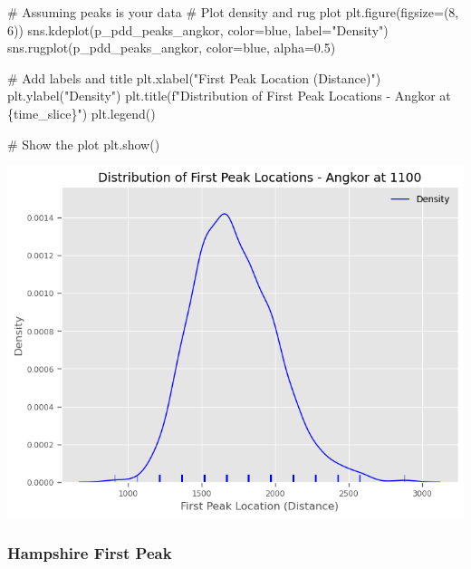 \documentclass[
  11pt,
  letterpaper,
  DIV=11,
  numbers=noendperiod]{scrartcl}
\newenvironment{Shaded}{\begin{snugshade}}{\end{snugshade}}
\newcommand{\CommentTok}[1]{\textcolor[rgb]{0.37,0.37,0.37}{#1}}
\newcommand{\DecValTok}[1]{\textcolor[rgb]{0.68,0.00,0.00}{#1}}
\newcommand{\FloatTok}[1]{\textcolor[rgb]{0.68,0.00,0.00}{#1}}
\newcommand{\NormalTok}[1]{\textcolor[rgb]{0.00,0.23,0.31}{#1}}
\newcommand{\OperatorTok}[1]{\textcolor[rgb]{0.37,0.37,0.37}{#1}}
\newcommand{\SpecialCharTok}[1]{\textcolor[rgb]{0.37,0.37,0.37}{#1}}
\newcommand{\SpecialStringTok}[1]{\textcolor[rgb]{0.13,0.47,0.30}{#1}}
\newcommand{\StringTok}[1]{\textcolor[rgb]{0.13,0.47,0.30}{#1}}
\begin{document}
\begin{Shaded}
\begin{Highlighting}[]
\CommentTok{\# Assuming \textasciigrave{}peaks\textasciigrave{} is your data}
\CommentTok{\# Plot density and rug plot}
\NormalTok{plt.figure(figsize}\OperatorTok{=}\NormalTok{(}\DecValTok{8}\NormalTok{, }\DecValTok{6}\NormalTok{))}
\NormalTok{sns.kdeplot(p\_pdd\_peaks\_angkor, color}\OperatorTok{=}\StringTok{\textquotesingle{}blue\textquotesingle{}}\NormalTok{, label}\OperatorTok{=}\StringTok{"Density"}\NormalTok{)}
\NormalTok{sns.rugplot(p\_pdd\_peaks\_angkor, color}\OperatorTok{=}\StringTok{\textquotesingle{}blue\textquotesingle{}}\NormalTok{, alpha}\OperatorTok{=}\FloatTok{0.5}\NormalTok{)}

\CommentTok{\# Add labels and title}
\NormalTok{plt.xlabel(}\StringTok{"First Peak Location (Distance)"}\NormalTok{)}
\NormalTok{plt.ylabel(}\StringTok{"Density"}\NormalTok{)}
\NormalTok{plt.title(}\SpecialStringTok{f"Distribution of First Peak Locations {-} Angkor at }\SpecialCharTok{\{}\NormalTok{time\_slice}\SpecialCharTok{\}}\SpecialStringTok{"}\NormalTok{)}
\NormalTok{plt.legend()}

\CommentTok{\# Show the plot}
\NormalTok{plt.show()}
\end{Highlighting}
\end{Shaded}

\includegraphics{analysis_files/figure-pdf/cell-38-output-1.png}

\subsubsection{Hampshire First Peak}\label{hampshire-first-peak}
\end{document}
